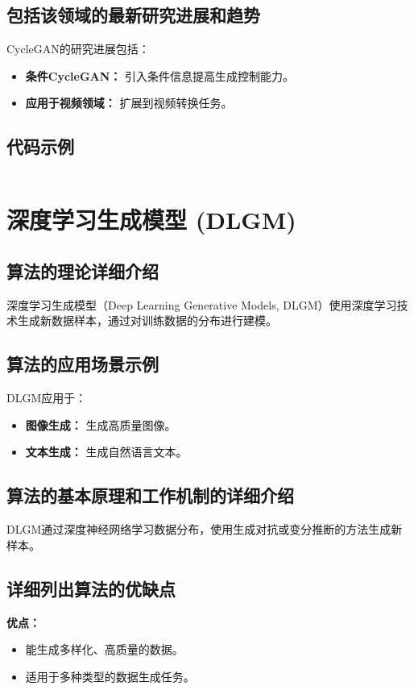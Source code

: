 \subsection*{包括该领域的最新研究进展和趋势}
CycleGAN的研究进展包括：
\begin{itemize}
    \item \textbf{条件CycleGAN：} 引入条件信息提高生成控制能力。
    \item \textbf{应用于视频领域：} 扩展到视频转换任务。
\end{itemize}
\subsection*{代码示例}
\begin{lstlisting}

\end{lstlisting}


\section{深度学习生成模型 (DLGM)}
\subsection*{算法的理论详细介绍}
深度学习生成模型（Deep Learning Generative Models, DLGM）使用深度学习技术生成新数据样本，通过对训练数据的分布进行建模。

\subsection*{算法的应用场景示例}
DLGM应用于：
\begin{itemize}
    \item \textbf{图像生成：} 生成高质量图像。
    \item \textbf{文本生成：} 生成自然语言文本。
\end{itemize}

\subsection*{算法的基本原理和工作机制的详细介绍}
DLGM通过深度神经网络学习数据分布，使用生成对抗或变分推断的方法生成新样本。

\subsection*{详细列出算法的优缺点}
\textbf{优点：}
\begin{itemize}
    \item 能生成多样化、高质量的数据。
    \item 适用于多种类型的数据生成任务。
\end{itemize}

